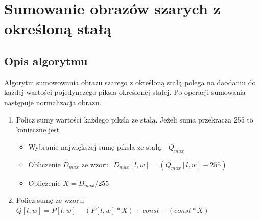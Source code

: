 \documentclass[a4paper,12pt, titlepage]{report}
\begin{document}
\section{Sumowanie obrazów szarych z określoną stałą}
\subsection*{Opis algorytmu}
\par Algorytm sumowowania obrazu szarego z określoną stałą polega na daodaniu do każdej wartości pojedynczego piksla określonej stałej. Po operacji sumowania następuje normalizacja obrazu.
\begin{enumerate}
\item Policz sumy wartości każdego piksla ze stałą. Jeżeli suma przekracza 255 to konieczne jest
\begin{itemize}
\item Wybranie największej sumę piksla ze stałą - \(Q_{max}\) 
\item Obliczenie \(D_{max}\) ze wzoru: \(D_{max}[l,w]=(Q_{max}[l,w]-255)\)
\item Obliczenie \(X=D_{max}/255\)
\end{itemize}
\item Policz sumę ze wzoru: \(Q[l,w]=P[l,w]-(P[l, w]*X)+const-(const*X)\)
\end{enumerate}
\end{document}
